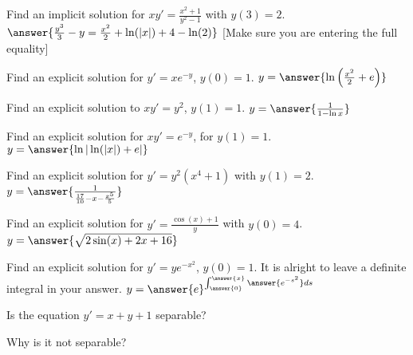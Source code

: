 \documentclass{ximera}
\begin{document}
\begin{exercise}
    Find an implicit solution for $xy' = \frac{x^2 + 1}{y^2 - 1}$ with $y(3) = 2$. $\answer{\frac{y^3}{3} - y = \frac{x^2}{2} +\ln(|x|) + 4 - \ln(2)}$ [Make sure you are entering the full equality]
\end{exercise}

\begin{exercise}
    Find an explicit solution for $y' = xe^{-y}$, $y(0)=1$. $y = \answer{\ln\left(\frac{x^2}{2} + e \right)}$
\end{exercise}

\begin{exercise}%
    Find an explicit solution to $x y' = y^2$, $y(1) = 1$. $y = \answer{\frac{1}{1-\ln x}}$
\end{exercise}

\begin{exercise}
    Find an explicit solution for $xy' = e^{-y}$, for $y(1)=1$. $y = \answer{\ln|\ln(|x|) + e|}$
\end{exercise}

\begin{exercise}
    Find an explicit solution for $y' = y^2(x^4 + 1)$ with $y(1) = 2$. $y = \answer{\frac{1}{\frac{17}{10} - x - \frac{x^5}{5}}}$
\end{exercise}

\begin{exercise}
    Find an explicit solution for $y' = \frac{\cos(x)+ 1}{y}$ with $y(0) = 4$. $y = \answer{\sqrt{2\sin(x) + 2x + 16}}$
\end{exercise}

\begin{exercise}
    Find an explicit solution for $y' = ye^{-x^2}$, $y(0)=1$.  It is alright to leave a definite integral in your answer. $y = \answer{e}^{\int_{\answer{0}}^{\answer{x}} \answer{e^{-s^2}} ds}$
\end{exercise}

\begin{exercise}
    Is the equation $y' = x+y+1$ separable? 
    \begin{multipleChoice}
    \end{multipleChoice}
    \begin{feedback}[correct]
        Why is it not separable?
    \end{feedback}
\end{exercise}
\end{document}
